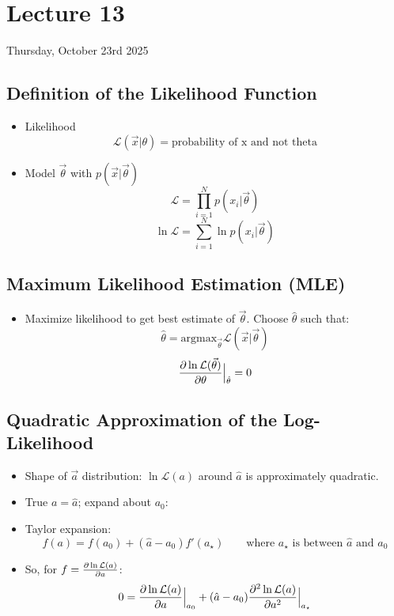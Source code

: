 \section{Lecture 13}

Thursday, October 23rd 2025

\subsection{Definition of the Likelihood Function}

\begin{itemize}
    \item Likelihood
          \[ \mathcal{L}(\vec{x}|\theta) = \text{probability of x and not theta} \]
    \item Model $\vec{\theta}$ with $p(\vec{x}|\vec{\theta})$
          \[ \mathcal{L} = \prod_{i=1}^{N} p(x_i|\vec{\theta}) \]
          \[ \ln \mathcal{L} = \sum_{i=1}^{N} \ln p(x_i|\vec{\theta}) \]
\end{itemize}

\subsection{Maximum Likelihood Estimation (MLE)}

\begin{itemize}
    \item Maximize likelihood to get best estimate of $\vec{\theta}$. Choose $\hat{\theta}$ such that:
          \[ \hat{\theta} = \text{argmax}_{\vec{\theta}} \mathcal{L}(\vec{x}|\vec{\theta}) \]
          \[ \pdv{\ln \mathcal{L(\vec{\theta})}}{\theta} \Big|_{\hat{\theta}} = 0 \]
\end{itemize}

\subsection{Quadratic Approximation of the Log-Likelihood}

\begin{itemize}
    \item Shape of $\vec{a}$ distribution: $\ln \mathcal{L}(a)$ around $\hat{a}$ is approximately quadratic.
    \item True $a = \hat{a}$; expand about $a_0$:
    \item Taylor expansion:
          \[ f(a) = f(a_0) + (\hat{a} - a_0) f'(a_\star) \qquad \text{where } a_{\star} \text{ is between } \hat{a} \text{ and } a_0 \]
    \item So, for $f = \pdv{\ln \mathcal{L}(a)}{a}$:
          \[ 0 = \pdv{\ln \mathcal{L}(a)}{a} \Big|_{a_0} + (\hat{a} - a_0) \pdv[2]{\ln \mathcal{L}(a)}{a} \Big|_{a_{\star}} \]
\end{itemize}

